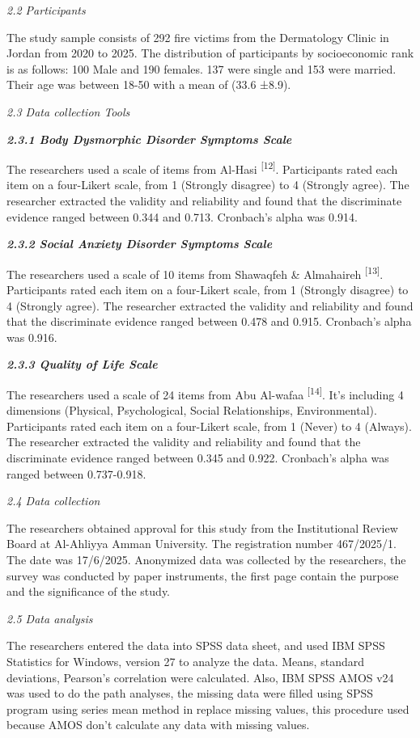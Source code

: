 \documentclass[
]{article}
\newcommand{\RL}[1]{\beginR #1\endR}
\newcommand{\RL}[1]{\bgroup\textdir TRT#1\egroup}
\begin{document}
\emph{2.2 Participants}

The study sample consists of 292 fire victims from the Dermatology
Clinic in Jordan from 2020 to 2025. The distribution of participants by
socioeconomic rank is as follows: 100 Male and 190 females. 137 were
single and 153 were married. Their age was between 18-50 with a mean of
(33.6 ±8.9).

\emph{2.3 Data collection Tools}

\emph{\textbf{2.3.1 Body Dysmorphic Disorder Symptoms Scale}}

The researchers used a scale of \RL{24} items from Al-Hasi
\textsuperscript{{[}12{]}}. Participants rated each item on a
four-Likert scale, from 1 (Strongly disagree) to 4 (Strongly agree). The
researcher extracted the validity and reliability and found that the
discriminate evidence ranged between 0.344 and 0.713. Cronbach's alpha
was 0.914.

\emph{\textbf{2.3.2 Social Anxiety Disorder Symptoms Scale}}

The researchers used a scale of 10 items from Shawaqfeh \& Almahaireh
\textsuperscript{{[}13{]}}. Participants rated each item on a
four-Likert scale, from 1 (Strongly disagree) to 4 (Strongly agree). The
researcher extracted the validity and reliability and found that the
discriminate evidence ranged between 0.478 and 0.915. Cronbach's alpha
was 0.916.

\emph{\textbf{2.3.3 Quality of Life Scale}}

The researchers used a scale of 24 items from Abu Al-wafaa
\textsuperscript{{[}14{]}}. It's including 4 dimensions (Physical,
Psychological, Social Relationships, Environmental). Participants rated
each item on a four-Likert scale, from 1 (Never) to 4 (Always). The
researcher extracted the validity and reliability and found that the
discriminate evidence ranged between 0.345 and 0.922. Cronbach's alpha
was ranged between 0.737-0.918.

\emph{2.4 Data collection}

The researchers obtained approval for this study from the Institutional
Review Board at Al-Ahliyya Amman University. The registration number
467/2025/1. The date was 17/6/2025. Anonymized data was collected by the
researchers, the survey was conducted by paper instruments, the first
page contain the purpose and the significance of the study.

\emph{2.5 Data analysis}

The researchers entered the data into SPSS data sheet, and used IBM SPSS
Statistics for Windows, version 27 to analyze the data. Means, standard
deviations, Pearson's correlation were calculated. Also, IBM SPSS AMOS
v24 was used to do the path analyses, the missing data were filled using
SPSS program using series mean method in replace missing values, this
procedure used because AMOS don't calculate any data with missing
values.
\end{document}
